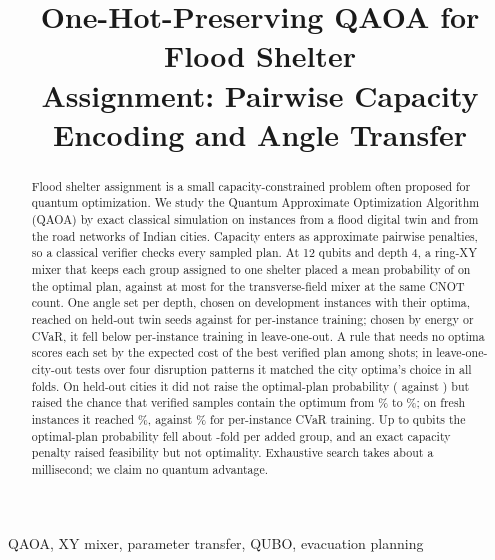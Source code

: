 \documentclass[conference]{IEEEtran}
\begin{document}
\title{One-Hot-Preserving QAOA for Flood Shelter\\
Assignment: Pairwise Capacity Encoding and Angle Transfer}

\author{
}

\maketitle

\begin{abstract}
Flood shelter assignment is a small capacity-constrained problem often proposed for quantum optimization. We study the Quantum Approximate Optimization Algorithm (QAOA) by exact classical simulation on instances from a flood digital twin and from the road networks of \CityNCities{} Indian cities. Capacity enters as approximate pairwise penalties, so a classical verifier checks every sampled plan. At 12 qubits and depth 4, a ring-XY mixer that keeps each group assigned to one shelter placed a mean probability of \SeedXYMean{} on the optimal plan, against at most \SeedXMax{} for the transverse-field mixer at the same CNOT count. One angle set per depth, chosen on development instances with their optima, reached \SelPopt{} on held-out twin seeds against \SelTrained{} for per-instance training; chosen by energy or CVaR, it fell below per-instance training in leave-one-out. A rule that needs no optima scores each set by the expected cost of the best verified plan among \Shots{} shots; in leave-one-city-out tests over four disruption patterns it matched the city optima's choice in all \LcFolds{} folds. On held-out cities it did not raise the optimal-plan probability (\LcVOpt{} against \LcTrained) but raised the chance that \Shots{} verified samples contain the optimum from \LcTrainedSucc\% to \LcVSucc\%; on \FrN{} fresh instances it reached \FrSetSucc\%, against \FrCvarSucc\% for per-instance CVaR training. Up to \ScQubitsMax{} qubits the optimal-plan probability fell about \ScDecay-fold per added group, and an exact capacity penalty raised feasibility but not optimality. Exhaustive search takes about a millisecond; we claim no quantum advantage.
\end{abstract}

\begin{IEEEkeywords}
QAOA, XY mixer, parameter transfer, QUBO, evacuation planning
\end{IEEEkeywords}
\end{document}
